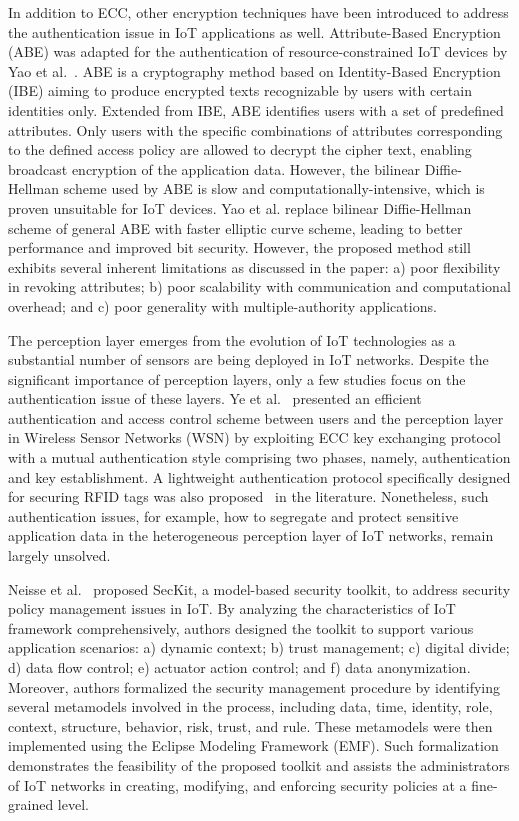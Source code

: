 In addition to ECC, other encryption techniques have been introduced to address the authentication issue in IoT applications as well. Attribute-Based Encryption (ABE) was adapted for the authentication of resource-constrained IoT devices by Yao et al.~\cite{DBLP:journals/fgcs/YaoCT15}. ABE is a cryptography method based on Identity-Based Encryption (IBE) aiming to produce encrypted texts recognizable by users with certain identities only. Extended from IBE, ABE identifies users with a set of predefined attributes. Only users with the specific combinations of attributes corresponding to the defined access policy are allowed to decrypt the cipher text, enabling broadcast encryption of the application data. However, the bilinear Diffie-Hellman scheme used by ABE is slow and computationally-intensive, which is proven unsuitable for IoT devices. Yao et al. replace bilinear Diffie-Hellman scheme of general ABE with faster elliptic curve scheme, leading to better performance and improved bit security. However, the proposed method still exhibits several inherent limitations as discussed in the paper: a) poor flexibility in revoking attributes; b) poor scalability with communication and computational overhead; and c) poor generality with multiple-authority applications.

The perception layer emerges from the evolution of IoT technologies as a substantial number of sensors are being deployed in IoT networks. Despite the significant importance of perception layers, only a few studies focus on the authentication issue of these layers. Ye et al.~\cite{ye2014efficient} presented an efficient authentication and access control scheme between users and the perception layer in Wireless Sensor Networks (WSN) by exploiting ECC key exchanging protocol with a mutual authentication style comprising two phases, namely, authentication and key establishment. A lightweight authentication protocol specifically designed for securing RFID tags was also proposed~\cite{al2016car} in the literature. Nonetheless, such authentication issues, for example, how to segregate and protect sensitive application data in the heterogeneous perception layer of IoT networks, remain largely unsolved.

Neisse et al.~\cite{DBLP:journals/compsec/NeisseSFB15} proposed SecKit, a model-based security toolkit, to address security policy management issues in IoT. By analyzing the characteristics of IoT framework comprehensively, authors designed the toolkit to support various application scenarios: a) dynamic context; b) trust management; c) digital divide; d) data flow control; e) actuator action control; and f) data anonymization. Moreover, authors formalized the security management procedure by identifying several metamodels involved in the process, including data, time, identity, role, context, structure, behavior, risk, trust, and rule. These metamodels were then implemented using the Eclipse Modeling Framework (EMF). Such formalization demonstrates the feasibility of the proposed toolkit and assists the administrators of IoT networks in creating, modifying, and enforcing security policies at a fine-grained level.
